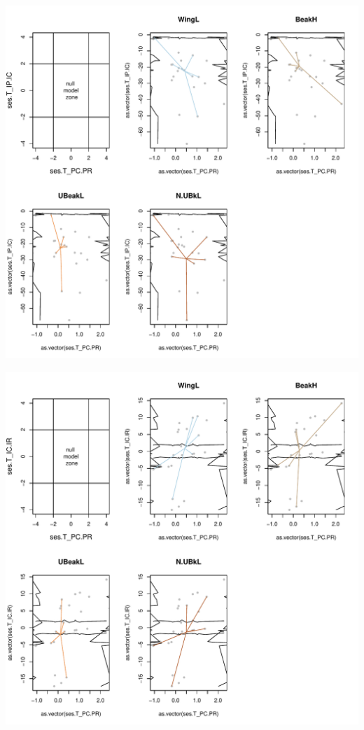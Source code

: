 \documentclass[12pt]{article}\usepackage[]{graphicx}\usepackage[]{color}
\makeatletter
\def\maxwidth{ %
  \ifdim\Gin@nat@width>\linewidth
    \linewidth
  \else
    \Gin@nat@width
  \fi
}
\newenvironment{knitrout}{}{} %
\makeatother
\begin{document}
\begin{knitrout}
\includegraphics[width=\maxwidth]{figure/unnamed-chunk-40-2} 

\includegraphics[width=\maxwidth]{figure/unnamed-chunk-40-3} 

\end{knitrout}
\end{document}

